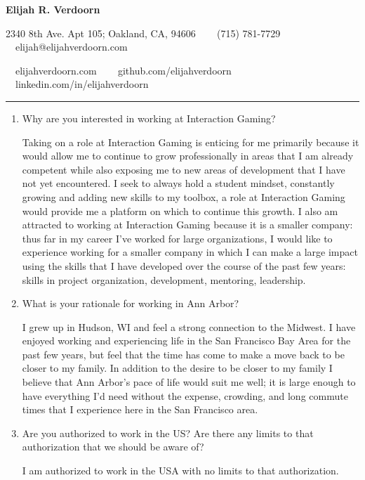 \documentclass[9pt,letterpaper]{article}
\begin{document}
\begin{center}
{\LARGE \textbf{Elijah R. Verdoorn}}

2340 8th Ave. Apt 105; Oakland, CA, 94606 \ \textbullet
\ \ (715) 781-7729\ \ \textbullet
\ \ elijah@elijahverdoorn.com

\ \ elijahverdoorn.com \ \textbullet
\ \ github.com/elijahverdoorn \ \textbullet
\ \ linkedin.com/in/elijahverdoorn
\end{center}

\hrule
\vspace{1em}

\begin{enumerate}
	\item Why are you interested in working at Interaction Gaming?

		Taking on a role at Interaction Gaming is enticing for me primarily because it would allow me to continue to grow professionally in areas that I am already competent while also exposing me to new areas of development that I have not yet encountered. I seek to always hold a student mindset, constantly growing and adding new skills to my toolbox, a role at Interaction Gaming would provide me a platform on which to continue this growth. I also am attracted to working at Interaction Gaming because it is a smaller company: thus far in my career I've worked for large organizations, I would like to experience working for a smaller company in which I can make a large impact using the skills that I have developed over the course of the past few years: skills in project organization, development, mentoring, leadership.

	\item What is your rationale for working in Ann Arbor?

		I grew up in Hudson, WI and feel a strong connection to the Midwest. I have enjoyed working and experiencing life in the San Francisco Bay Area for the past few years, but feel that the time has come to make a move back to be closer to my family. In addition to the desire to be closer to my family I believe that Ann Arbor's pace of life would suit me well; it is large enough to have everything I'd need without the expense, crowding, and long commute times that I experience here in the San Francisco area.

	\item Are you authorized to work in the US? Are there any limits to that authorization that we should be aware of?

		I am authorized to work in the USA with no limits to that authorization.


\end{enumerate}
\end{document}
